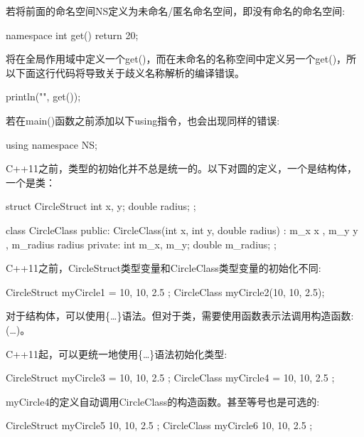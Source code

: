 若将前面的命名空间NS定义为未命名/匿名命名空间，即没有命名的命名空间:

\begin{cpp}
namespace
{
    int get() { return 20; }
}
\end{cpp}

将在全局作用域中定义一个get()，而在未命名的名称空间中定义另一个get()，所以下面这行代码将导致关于歧义名称解析的编译错误。

\begin{cpp}
println("{}", get());
\end{cpp}

若在main()函数之前添加以下using指令，也会出现同样的错误:

\begin{cpp}
using namespace NS;
\end{cpp}


C++11之前，类型的初始化并不总是统一的。以下对圆的定义，一个是结构体，一个是类：

\begin{cpp}
struct CircleStruct
{
    int x, y;
    double radius;
};

class CircleClass
{
    public:
        CircleClass(int x, int y, double radius)
            : m_x { x }, m_y { y }, m_radius { radius } {}
    private:
        int m_x, m_y;
        double m_radius;
};
\end{cpp}

C++11之前，CircleStruct类型变量和CircleClass类型变量的初始化不同:

\begin{cpp}
CircleStruct myCircle1 = { 10, 10, 2.5 };
CircleClass myCircle2(10, 10, 2.5);
\end{cpp}

对于结构体，可以使用\{…\}语法。但对于类，需要使用函数表示法调用构造函数:(…)。

C++11起，可以更统一地使用\{…\}语法初始化类型:

\begin{cpp}
CircleStruct myCircle3 = { 10, 10, 2.5 };
CircleClass myCircle4 = { 10, 10, 2.5 };
\end{cpp}

myCircle4的定义自动调用CircleClass的构造函数。甚至等号也是可选的:

\begin{cpp}
CircleStruct myCircle5 { 10, 10, 2.5 };
CircleClass myCircle6 { 10, 10, 2.5 };
\end{cpp}

